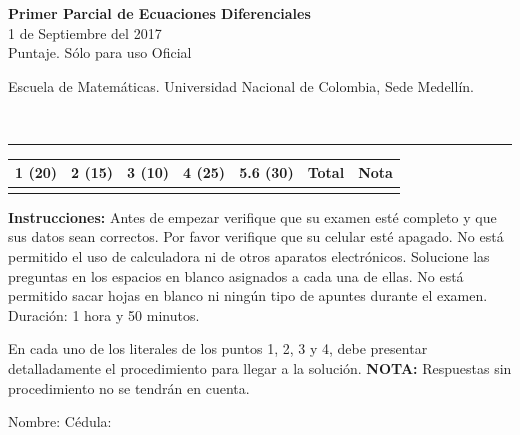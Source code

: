 \documentclass[11pt]{article}
\begin{document}
\noindent
\begin{minipage}[t]{0.62\linewidth}
  {\bfseries\large Primer Parcial de Ecuaciones Diferenciales}\\[2pt]
  {\small 1 de Septiembre del 2017}\\
  {\small Puntaje. Sólo para uso Oficial}
\end{minipage}%
\hfill
\begin{minipage}[t]{0.35\linewidth}
  \raggedleft\small Escuela de Matemáticas. Universidad Nacional de Colombia, Sede Medellín.
\end{minipage}\\[4pt]
\rule{\linewidth}{0.6pt}

\vspace{4pt}
\noindent
\begin{tabular}{|c|c|c|c|c|c|c|}
\hline
1 (20) & 2 (15) & 3 (10) & 4 (25) & 5.6 (30) & Total & Nota \\
\hline
 & & & & & & \\
\hline
\end{tabular}

\vspace{6pt}
\noindent\textbf{Instrucciones:} Antes de empezar verifique que su examen esté completo y que sus datos sean correctos. Por favor verifique que su celular esté apagado. No está permitido el uso de calculadora ni de otros aparatos electrónicos. Solucione las preguntas en los espacios en blanco asignados a cada una de ellas. No está permitido sacar hojas en blanco ni ningún tipo de apuntes durante el examen. Duración: 1 hora y 50 minutos.

\vspace{4pt}
\noindent En cada uno de los literales de los puntos 1, 2, 3 y 4, debe presentar detalladamente el procedimiento para llegar a la solución. \textbf{NOTA:} Respuestas sin procedimiento no se tendrán en cuenta.

\vspace{8pt}
\noindent Nombre: \makebox[0.45\linewidth]{\hrulefill} \hfill Cédula: \makebox[0.3\linewidth]{\hrulefill}
\end{document}
